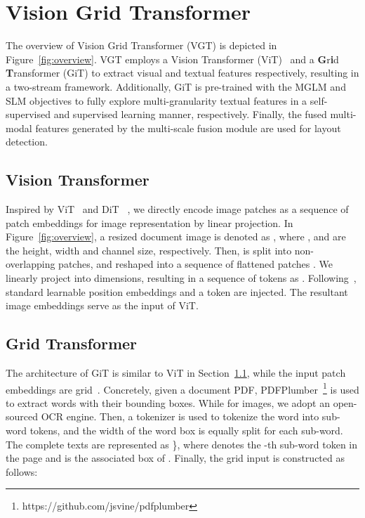 \documentclass[10pt,twocolumn,letterpaper]{article}
\begin{document}
\section{Vision Grid Transformer}

The overview of Vision Grid Transformer (VGT) is depicted in Figure~\ref{fig:overview}.
VGT employs a Vision Transformer (ViT)~\cite{vit} and a \textbf{G}r\textbf{i}d \textbf{T}ransformer (GiT) to extract visual and textual features respectively, resulting in a two-stream framework.
Additionally,  GiT is pre-trained with the MGLM and SLM objectives to fully explore multi-granularity textual features in a self-supervised and supervised learning manner, respectively.
Finally, the fused multi-modal features generated by the multi-scale fusion module are used for layout detection.


\subsection{Vision Transformer}
\label{sec:Image}
Inspired by ViT~\cite{vit} and DiT~\cite{li2022dit} , 
we directly encode image patches as a sequence of patch embeddings for image representation by linear projection.
In Figure~\ref{fig:overview}, a resized document image is denoted as ,
where ,  and  are the height, width and channel size, respectively.
Then,  is split into non-overlapping   patches, and reshaped into a sequence of flattened  patches .
We linearly project  into  dimensions, resulting in a sequence of  tokens as .
Following~\cite{vit}, standard learnable  position embeddings and a  token are injected.
The resultant image embeddings serve as the input of ViT. 

\subsection{Grid Transformer}
The architecture of GiT is similar to ViT in Section~\ref{sec:Image},
while the input patch embeddings are grid~\cite{katti2018chargrid,denk2019bertgrid}.
Concretely, given a document PDF, PDFPlumber~\footnote{https://github.com/jsvine/pdfplumber} is used to extract words with their bounding boxes.
While for images, we adopt an open-sourced OCR engine.
Then, a tokenizer is used to tokenize the word into sub-word tokens, 
and the width of the word box is equally split for each sub-word.
The complete texts are represented as  \}, where  denotes the -th sub-word token in the page and  is the associated box of . 
Finally, the grid input  is constructed as follows:
\end{document}
